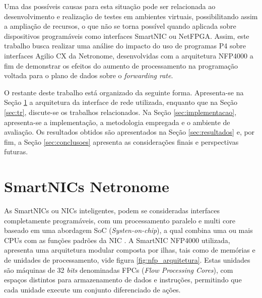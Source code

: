 \documentclass[12pt]{article}
\begin{document}
Uma das possíveis causas para esta situação pode ser relacionada ao desenvolvimento e realização de testes em ambientes virtuais, possibilitando assim a ampliação de recursos, o que não se torna possível quando aplicada sobre dispositivos programáveis como interfaces SmartNIC ou NetFPGA. Assim, este trabalho busca realizar uma análise do impacto do uso de programas P4 sobre interfaces Agilio CX da Netronome, desenvolvidas com a arquitetura NFP4000 a fim de demonstrar os efeitos do aumento de processamento na programação voltada para o plano de dados sobre o \textit{forwarding rate}.


O restante deste trabalho está organizado da seguinte forma. Apresenta-se na Seção \ref{sec:smartnic} a arquitetura da interface de rede utilizada, enquanto que na Seção \ref{sec:tr}, discute-se os trabalhos relacionados. Na Seção \ref{sec:implementacao}, apresenta-se a implementação, a metodologia empregada e o ambiente de avaliação. Os resultados obtidos são apresentados na Seção \ref{sec:resultados} e, por fim, a Seção \ref{sec:conclusoes} apresenta as considerações finais e perspectivas futuras.

\section{SmartNICs Netronome} \label{sec:smartnic}

As SmartNICs ou NICs inteligentes, podem se consideradas interfaces completamente programáveis, com um processamento paralelo e multi core baseado em uma abordagem SoC (\textit{Systen-on-chip}), a qual combina uma ou mais CPUs com as funções padrões da NIC \cite{intro_snic_19}.  A SmartNIC NFP4000 \cite{nfp4000_16} utilizada, apresenta uma arquitetura modular composta por ilhas, tais como de memórias e de unidades de processamento, vide figura \ref{fig:nfp_arquitetura}. Estas unidades são máquinas de 32 \textit{bits} denominadas FPCs (\textit{Flow Processing Cores}), com  espaços distintos para armazenamento de dados e instruções, permitindo que cada unidade execute um conjunto diferenciado de ações.
\end{document}
